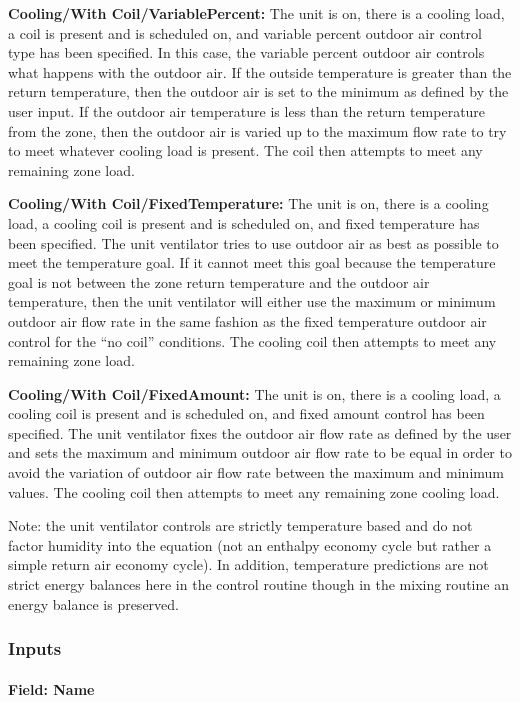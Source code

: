 \textbf{Cooling/With Coil/VariablePercent:} The unit is on, there is a cooling load, a coil is present and is scheduled on, and variable percent outdoor air control type has been specified. In this case, the variable percent outdoor air controls what happens with the outdoor air. If the outside temperature is greater than the return temperature, then the outdoor air is set to the minimum as defined by the user input. If the outdoor air temperature is less than the return temperature from the zone, then the outdoor air is varied up to the maximum flow rate to try to meet whatever cooling load is present. The coil then attempts to meet any remaining zone load.

\textbf{Cooling/With Coil/FixedTemperature:} The unit is on, there is a cooling load, a cooling coil is present and is scheduled on, and fixed temperature has been specified. The unit ventilator tries to use outdoor air as best as possible to meet the temperature goal. If it cannot meet this goal because the temperature goal is not between the zone return temperature and the outdoor air temperature, then the unit ventilator will either use the maximum or minimum outdoor air flow rate in the same fashion as the fixed temperature outdoor air control for the ``no coil'' conditions. The cooling coil then attempts to meet any remaining zone load.

\textbf{Cooling/With Coil/FixedAmount:} The unit is on, there is a cooling load, a cooling coil is present and is scheduled on, and fixed amount control has been specified. The unit ventilator fixes the outdoor air flow rate as defined by the user and sets the maximum and minimum outdoor air flow rate to be equal in order to avoid the variation of outdoor air flow rate between the maximum and minimum values. The cooling coil then attempts to meet any remaining zone cooling load.

Note: the unit ventilator controls are strictly temperature based and do not factor humidity into the equation (not an enthalpy economy cycle but rather a simple return air economy cycle). In addition, temperature predictions are not strict energy balances here in the control routine though in the mixing routine an energy balance is preserved.

\subsubsection{Inputs}\label{inputs-2-049}

\paragraph{Field: Name}\label{field-name-2-045}


